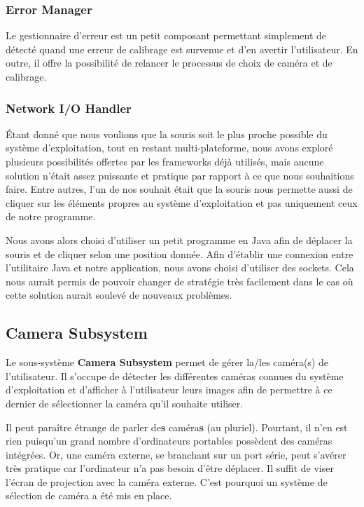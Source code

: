 \documentclass[11pt,a4paper,oldfontcommands]{memoir}
\begin{document}
\subsubsection{Error Manager}

Le gestionnaire d'erreur est un petit composant permettant simplement de détecté quand une erreur de calibrage est survenue et d'en avertir l'utilisateur. En outre, il offre la possibilité de relancer le processus de choix de caméra et de calibrage.

\subsubsection{Network I/O Handler}

Étant donné que nous voulions que la souris soit le plus proche possible du système d'exploitation, tout en restant multi-plateforme, nous avons exploré plusieurs possibilités offertes par les frameworks déjà utilisés, mais aucune solution n'était assez puissante et pratique par rapport à ce que nous souhaitions faire. Entre autres, l'un de nos souhait était que la souris nous permette aussi de cliquer sur les éléments propres au système d'exploitation et pas uniquement ceux de notre programme.

Nous avons alors choisi d'utiliser un petit programme en Java afin de déplacer la souris et de cliquer selon une position donnée. Afin d'établir une connexion entre l'utilitaire Java et notre application, nous avons choisi d'utiliser des sockets. Cela nous aurait permis de pouvoir changer de stratégie très facilement dans le cas où cette solution aurait soulevé de nouveaux problèmes.

\newpage

\subsection{Camera Subsystem}

Le sous-système \textbf{Camera Subsystem} permet de gérer la/les caméra(s) de l'utilisateur. Il s'occupe de détecter les différentes caméras connues du système d'exploitation et d'afficher à l'utilisateur leurs images afin de permettre à ce dernier de sélectionner la caméra qu'il souhaite utiliser.

Il peut paraître étrange de parler de\textbf{s} caméra\textbf{s} (au pluriel). Pourtant, il n'en est rien puisqu'un grand nombre d'ordinateurs portables possèdent des caméras intégrées. Or, une caméra externe, se branchant sur un port série, peut s'avérer très pratique car l'ordinateur n'a pas besoin d'être déplacer. Il suffit de viser l'écran de projection avec la caméra externe. C'est pourquoi un système de sélection de caméra a été mis en place.
\end{document}

